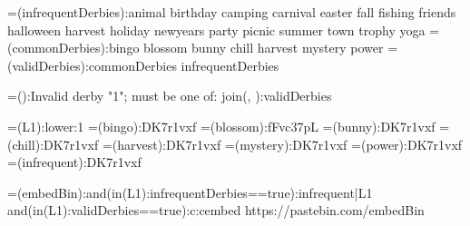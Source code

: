 {=(infrequentDerbies):animal birthday camping carnival easter fall fishing friends halloween harvest holiday newyears party picnic summer town trophy yoga}
{=(commonDerbies):bingo blossom bunny chill harvest mystery power}
{=(validDerbies):{commonDerbies} {infrequentDerbies}}

{=():Invalid derby "{1}"; must be one of: {join(, ):{validDerbies}}}

{=(L1):{lower:{1}}}
{=(bingo):DK7r1vxf}
{=(blossom):fFvc37pL}
{=(bunny):DK7r1vxf}
{=(chill):DK7r1vxf}
{=(harvest):DK7r1vxf}
{=(mystery):DK7r1vxf}
{=(power):DK7r1vxf}
{=(infrequent):DK7r1vxf}


{=(embedBin):{{and({in({L1}):{infrequentDerbies}}==true):infrequent|{L1}}}}
{{and({in({L1}):{validDerbies}}==true):c:cembed https://pastebin.com/{embedBin}}}
